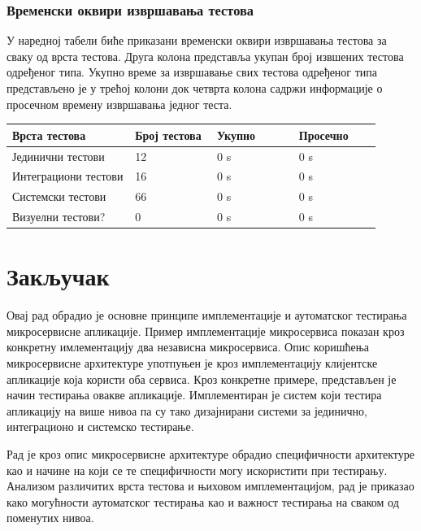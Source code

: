 \documentclass[12pt,oneside]{memoir}
\begin{document}
 \newpage


\subsection{Временски оквири извршавања тестова}

У наредној табели биће приказани временски оквири извршавања тестова за сваку од врста тестова. Друга колона представља укупан број извшених тестова одређеног типа. Укупно време за извршавање свих тестова одређеног типа представљено је у трећој колони док четврта колона садржи информације о просечном времену извршавања једног теста.

\begin{center}
\begin{tabular}{|p{0.3\linewidth} p{0.2\linewidth} p{0.2\linewidth} p{0.2\linewidth}|} 
 \hline
 Врста тестова & Број тестова & Укупно & Просечно \\ [0.5ex] 
 \hline\hline
 Јединични тестови & 12 & 0 s & 0 s\\ 
 \hline
 Интеграциони тестови & 16 & 0 s & 0 s \\
 \hline
 Системски тестови & 66 & 0 s & 0 s \\
 \hline
 Визуелни тестови? & 0 & 0 s & 0 s \\
 \hline
\end{tabular}
\end{center}



\chapter{Закључак}

Овај рад обрадио је основне принципе имплементације и аутоматског тестирања микросервисне апликације. Пример имплементације микросервиса показан кроз конкретну имлементацију два независна микросервиса. Опис коришћења микросервисне архитектуре употпуњен је кроз имплементацију клијентске апликације која користи оба сервиса. Кроз конкретне примере, представљен је начин тестирања овакве апликације. Имплементиран је систем који тестира апликацију на више нивоа па су тако дизајнирани системи за јединично, интеграционо и системско тестирање.

Рад је кроз опис микросервисне архитектуре обрадио специфичности архитектуре као и начине на који се те специфичности могу искористити при тестирању. Анализом различитих врста тестова и њиховом имплементацијом, рад је приказао како могућности аутоматског тестирања као и важност тестирања на сваком од поменутих нивоа. 
\end{document}
